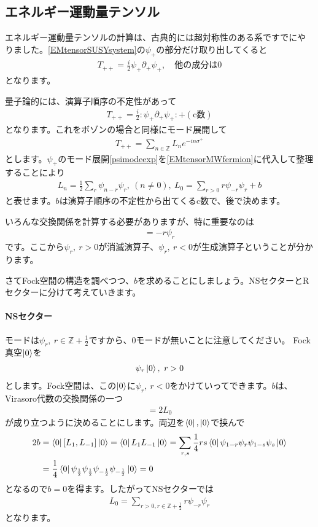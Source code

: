 \documentclass[report,paper=a4, fontsize=12pt, line_length=16cm, number_of_lines=33,dvipdfmx]{jlreq}
\numberwithin{equation}{chapter}
\numberwithin{equation}{section}
\newcommand{\Zb}{\mathbb{Z}}
\newcommand{\del}{\partial}
\begin{document}
\subsection{エネルギー運動量テンソル}
エネルギー運動量テンソルの計算は、古典的には超対称性のある系ですでにやりました。\eqref{EMtensorSUSYsystem}の$\psi_{+}$の部分だけ取り出してくると
\begin{align}
  T_{++}=\frac{i}{2} \psi_{+}\del_{+}\psi_{+},\quad \text{他の成分は0}
\end{align}
となります。

量子論的には、演算子順序の不定性があって
\begin{align}
  T_{++}=\frac{i}{2}:\psi_{+}\del_{+}\psi_{+}:+(\text{c数})\label{EMtensorMWfermion}
\end{align}
となります。これをボゾンの場合と同様にモード展開して
\begin{align}
  T_{++}=\sum_{n\in\Zb}L_{n}e^{-in\sigma^{+}}
\end{align}
とします。$\psi_{+}$のモード展開\eqref{psimodeexp}を\eqref{EMtensorMWfermion}に代入して整理することにより
\begin{align}
  L_{n}=\frac{1}{2}\sum_{r}\psi_{n-r}\psi_{r},\ (n\ne 0),\ 
  L_0=\sum_{r>0}r\psi_{-r}\psi_{r}+b
\end{align}
と表せます。$b$は演算子順序の不定性から出てくるc数で、後で決めます。

いろんな交換関係を計算する必要がありますが、特に重要なのは
\begin{align}
  [L_0,\psi_r]=-r\psi_{r}
\end{align}
です。ここから$\psi_{r},\ r>0$が消滅演算子、$\psi_{r},\ r<0$が生成演算子ということが分かります。

さてFock空間の構造を調べつつ、$b$を求めることにしましょう。NSセクターとRセクターに分けて考えていきます。

\paragraph{NSセクター}
モードは$\psi_{r},\ r\in \Zb+\frac12$ですから、0モードが無いことに注意してください。
Fock真空$\ket{0}$を
\begin{align}
  \psi_{r}\ket{0},\ r>0
\end{align}
とします。Fock空間は、この$\ket{0}$に$\psi_{r},\ r<0$をかけていってできます。$b$は、Virasoro代数の交換関係の一つ
\begin{align}
  [L_{1},L_{-1}]=2L_{0}
\end{align}
が成り立つように決めることにします。両辺を$\bra{0},\ket{0}$で挟んで
\begin{align}
  2b
  &=\bra{0}[L_{1},L_{-1}]\ket{0}
  =\bra{0}L_{1}L_{-1}\ket{0}
  =\sum_{r,s}\frac14rs\bra{0}\psi_{1-r}\psi_{r}\psi_{1-s}\psi_{s}\ket{0}\nonumber\\
  &=\frac14 \bra{0}\psi_{\frac12}\psi_{\frac12}\psi_{-\frac12}\psi_{-\frac12}\ket{0}=0
\end{align}
となるので$b=0$を得ます。したがってNSセクターでは
\begin{align}
  L_0=\sum_{r>0,r\in \Zb+\frac12} r\psi_{-r}\psi_{r}
\end{align}
となります。
\end{document}

